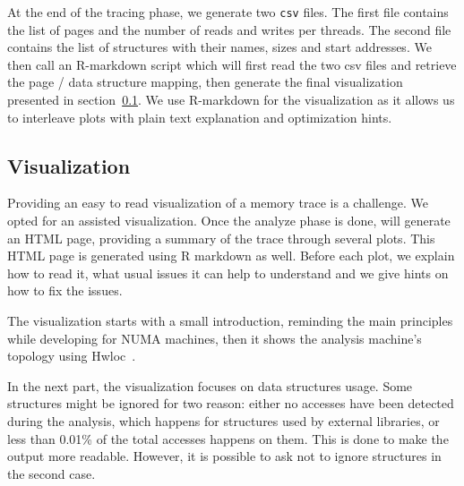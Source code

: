 At the end of the tracing phase, we generate two \texttt{csv} files.
The first file contains the list of pages and the number of reads
and writes per threads. The second file contains the
list of structures with their names, sizes and start addresses.
We then call an R-markdown script which will first read the two csv files and
retrieve the page / data structure mapping, then generate the final
visualization presented in section~\ref{sec:design-visu}. We use R-markdown
for the visualization as it allows us to interleave plots with plain text
explanation and optimization hints.


\subsection{Visualization}
\label{sec:design-visu}

Providing an easy to read visualization of a memory trace is a challenge. We opted for an
assisted visualization. Once the analyze phase is done, \TABARNAC will
generate an HTML page, providing a summary of the trace through several plots.
This HTML page is generated using R markdown as well.
Before each plot, we explain how to read it, what
usual issues it can help to understand and we give hints on how to fix the issues.

The visualization starts with a small introduction, reminding the main
principles while developing for NUMA machines, then it shows the analysis
machine's topology using Hwloc~\cite{Broquedis10hwloc}.

In the next part, the visualization focuses on data structures usage. Some structures might
be ignored for two reason: either no accesses have been detected during the
analysis, which happens for structures used by external libraries, or less than 0.01\% of the total accesses happens on them. This is done to make the output
more readable. However, it is possible to ask \TABARNAC not to ignore
structures in the second case.

